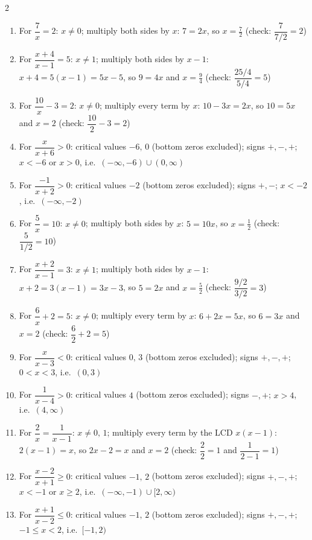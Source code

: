 \documentclass[11pt]{article}
\begin{document}
\begin{keybox}
\begin{multicols}{2}
\small
\begin{enumerate}[leftmargin=*,itemsep=3pt]
  \item For $\dfrac7x=2$: $x\ne0$; multiply both sides by $x$: $7=2x$, so $x=\tfrac72$ (check: $\dfrac{7}{7/2}=2$)
  \item For $\dfrac{x+4}{x-1}=5$: $x\ne1$; multiply both sides by $x-1$: $x+4=5(x-1)=5x-5$, so $9=4x$ and $x=\tfrac94$ (check: $\dfrac{25/4}{5/4}=5$)
  \item For $\dfrac{10}x-3=2$: $x\ne0$; multiply every term by $x$: $10-3x=2x$, so $10=5x$ and $x=2$ (check: $\dfrac{10}{2}-3=2$)
  \item For $\dfrac{x}{x+6}>0$: critical values $-6,\,0$ (bottom zeros excluded); signs $+,-,+$; $x<-6\text{ or }x>0$, i.e.\ $(-\infty,-6)\cup(0,\infty)$
  \item For $\dfrac{-1}{x+2}>0$: critical values $-2$ (bottom zeros excluded); signs $+,-$; $x<-2$, i.e.\ $(-\infty,-2)$
  \item For $\dfrac5x=10$: $x\ne0$; multiply both sides by $x$: $5=10x$, so $x=\tfrac12$ (check: $\dfrac{5}{1/2}=10$)
  \item For $\dfrac{x+2}{x-1}=3$: $x\ne1$; multiply both sides by $x-1$: $x+2=3(x-1)=3x-3$, so $5=2x$ and $x=\tfrac52$ (check: $\dfrac{9/2}{3/2}=3$)
  \item For $\dfrac6x+2=5$: $x\ne0$; multiply every term by $x$: $6+2x=5x$, so $6=3x$ and $x=2$ (check: $\dfrac62+2=5$)
  \item For $\dfrac{x}{x-3}<0$: critical values $0,\,3$ (bottom zeros excluded); signs $+,-,+$; $0<x<3$, i.e.\ $(0,3)$
  \item For $\dfrac{1}{x-4}>0$: critical values $4$ (bottom zeros excluded); signs $-,+$; $x>4$, i.e.\ $(4,\infty)$
  \item For $\dfrac2x=\dfrac{1}{x-1}$: $x\ne0,\,1$; multiply every term by the LCD $x(x-1)$: $2(x-1)=x$, so $2x-2=x$ and $x=2$ (check: $\dfrac22=1$ and $\dfrac{1}{2-1}=1$)
  \item For $\dfrac{x-2}{x+1}\ge0$: critical values $-1,\,2$ (bottom zeros excluded); signs $+,-,+$; $x<-1\text{ or }x\ge2$, i.e.\ $(-\infty,-1)\cup[2,\infty)$
  \item For $\dfrac{x+1}{x-2}\le0$: critical values $-1,\,2$ (bottom zeros excluded); signs $+,-,+$; $-1\le x<2$, i.e.\ $[-1,2)$
\end{enumerate}
\end{multicols}
\end{keybox}
\end{document}
